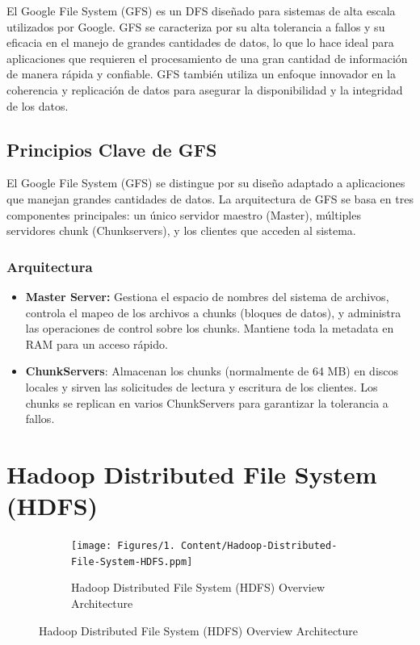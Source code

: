 El Google File System (GFS) es un DFS diseñado para sistemas de alta escala utilizados por Google. GFS se caracteriza por su alta tolerancia a fallos y su eficacia en el manejo de grandes cantidades de datos, lo que lo hace ideal para aplicaciones que requieren el procesamiento de una gran cantidad de información de manera rápida y confiable. GFS también utiliza un enfoque innovador en la coherencia y replicación de datos para asegurar la disponibilidad y la integridad de los datos.

\subsection{Principios Clave de GFS}

El Google File System (GFS) se distingue por su diseño adaptado a aplicaciones que manejan grandes cantidades de datos. La arquitectura de GFS se basa en tres componentes principales: un único servidor maestro (Master), múltiples servidores chunk (Chunkservers), y los clientes que acceden al sistema.

\subsubsection{Arquitectura}

\begin{itemize}
    \item \textbf{Master Server:} Gestiona el espacio de nombres del sistema de archivos, controla el mapeo de los archivos a chunks (bloques de datos), y administra las operaciones de control sobre los chunks. Mantiene toda la metadata en RAM para un acceso rápido.
    \item \textbf{ChunkServers}: Almacenan los chunks (normalmente de 64 MB) en discos locales y sirven las solicitudes de lectura y escritura de los clientes. Los chunks se replican en varios ChunkServers para garantizar la tolerancia a fallos.
\end{itemize}


\section{Hadoop Distributed File System (HDFS)}

\begin{figure}[H]
    \centering
    \begin{subfigure}[b]{0.5\textwidth}
        \centering
        \texttt{[image: Figures/1. Content/Hadoop-Distributed-File-System-HDFS.ppm]}
        \caption{Hadoop Distributed File System (HDFS) Overview Architecture}
        \label{fig: HDFSArchitecture}
    \end{subfigure}
    \hfill
\end{figure}

